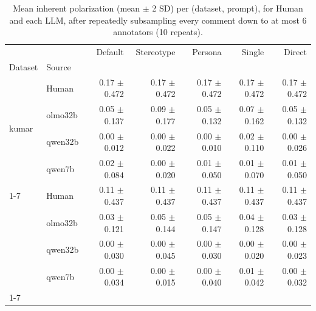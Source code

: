 \begin{table}[t]
\small
\centering
\caption{Mean inherent polarization (mean $\pm$ 2 SD) per (dataset, prompt), for Human and each LLM, after repeatedly subsampling every comment down to at most 6 annotators (10 repeats).}
\label{tab:inherent-polarization-subsampled-n6}
\begin{tabular}{llrrrrr}
\toprule
 &  & Default & Stereotype & Persona & Single & Direct \\
Dataset & Source &  &  &  &  &  \\
\midrule
\multirow[t]{4}{*}{kumar} & Human & 0.17 $\pm$ 0.472 & 0.17 $\pm$ 0.472 & 0.17 $\pm$ 0.472 & 0.17 $\pm$ 0.472 & 0.17 $\pm$ 0.472 \\
 & olmo32b & 0.05 $\pm$ 0.137 & 0.09 $\pm$ 0.177 & 0.05 $\pm$ 0.132 & 0.07 $\pm$ 0.162 & 0.05 $\pm$ 0.132 \\
 & qwen32b & 0.00 $\pm$ 0.012 & 0.00 $\pm$ 0.022 & 0.00 $\pm$ 0.010 & 0.02 $\pm$ 0.110 & 0.00 $\pm$ 0.026 \\
 & qwen7b & 0.02 $\pm$ 0.084 & 0.00 $\pm$ 0.020 & 0.01 $\pm$ 0.050 & 0.01 $\pm$ 0.070 & 0.01 $\pm$ 0.050 \\
\cline{1-7}
\multirow[t]{4}{*}{sap} & Human & 0.11 $\pm$ 0.437 & 0.11 $\pm$ 0.437 & 0.11 $\pm$ 0.437 & 0.11 $\pm$ 0.437 & 0.11 $\pm$ 0.437 \\
 & olmo32b & 0.03 $\pm$ 0.121 & 0.05 $\pm$ 0.144 & 0.05 $\pm$ 0.147 & 0.04 $\pm$ 0.128 & 0.03 $\pm$ 0.128 \\
 & qwen32b & 0.00 $\pm$ 0.030 & 0.00 $\pm$ 0.045 & 0.00 $\pm$ 0.030 & 0.00 $\pm$ 0.020 & 0.00 $\pm$ 0.023 \\
 & qwen7b & 0.00 $\pm$ 0.034 & 0.00 $\pm$ 0.015 & 0.00 $\pm$ 0.040 & 0.01 $\pm$ 0.042 & 0.00 $\pm$ 0.032 \\
\cline{1-7}
\bottomrule
\end{tabular}
\end{table}
